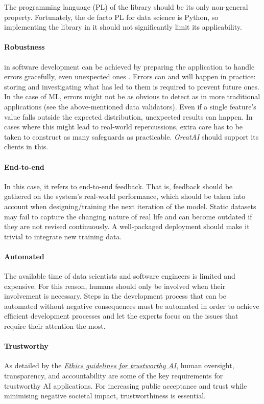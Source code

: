 The programming language (PL) of the library should be its only non-general property. Fortunately, the de facto PL for data science is Python, so implementing the library in it should not significantly limit its applicability.

\paragraph{Robustness} in software development can be achieved by preparing the application to handle errors gracefully, even unexpected ones \cite{bishop1998robust}. Errors can and will happen in practice: storing and investigating what has led to them is required to prevent future ones. In the case of ML, errors might not be as obvious to detect as in more traditional applications (see the above-mentioned data validators). Even if a single feature's value falls outside the expected distribution, unexpected results can happen. In cases where this might lead to real-world repercussions, extra care has to be taken to construct as many safeguards as practicable. \textit{GreatAI} should support its clients in this.

\paragraph{End-to-end} In this case, it refers to end-to-end feedback. That is, feedback should be gathered on the system's real-world performance, which should be taken into account when designing/training the next iteration of the model. Static datasets may fail to capture the changing nature of real life and can become outdated if they are not revised continuously. A well-packaged deployment should make it trivial to integrate new training data.

\paragraph{Automated} The available time of data scientists and software engineers is limited and expensive. For this reason, humans should only be involved when their involvement is necessary. Steps in the development process that can be automated without negative consequences must be automated in order to achieve efficient development processes and let the experts focus on the issues that require their attention the most.

\paragraph{Trustworthy} As detailed by the \href{https://digital-strategy.ec.europa.eu/en/library/ethics-guidelines-trustworthy-ai}{\textit{Ethics guidelines for trustworthy AI}}, human oversight, transparency, and accountability are some of the key requirements for trustworthy AI applications. For increasing public acceptance and trust while minimising negative societal impact, trustworthiness is essential.

